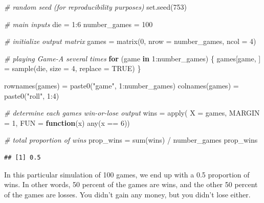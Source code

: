 \documentclass[
]{book}
\newenvironment{Shaded}{\begin{snugshade}}{\end{snugshade}}
\newcommand{\AttributeTok}[1]{\textcolor[rgb]{0.77,0.63,0.00}{#1}}
\newcommand{\CommentTok}[1]{\textcolor[rgb]{0.56,0.35,0.01}{\textit{#1}}}
\newcommand{\ConstantTok}[1]{\textcolor[rgb]{0.00,0.00,0.00}{#1}}
\newcommand{\ControlFlowTok}[1]{\textcolor[rgb]{0.13,0.29,0.53}{\textbf{#1}}}
\newcommand{\DecValTok}[1]{\textcolor[rgb]{0.00,0.00,0.81}{#1}}
\newcommand{\FunctionTok}[1]{\textcolor[rgb]{0.00,0.00,0.00}{#1}}
\newcommand{\NormalTok}[1]{#1}
\newcommand{\OtherTok}[1]{\textcolor[rgb]{0.56,0.35,0.01}{#1}}
\newcommand{\SpecialCharTok}[1]{\textcolor[rgb]{0.00,0.00,0.00}{#1}}
\newcommand{\StringTok}[1]{\textcolor[rgb]{0.31,0.60,0.02}{#1}}
\begin{document}
\begin{Shaded}
\begin{Highlighting}[]
\CommentTok{\# random seed (for reproducibility purposes)}
\FunctionTok{set.seed}\NormalTok{(}\DecValTok{753}\NormalTok{)}

\CommentTok{\# main inputs}
\NormalTok{die }\OtherTok{=} \DecValTok{1}\SpecialCharTok{:}\DecValTok{6}
\NormalTok{number\_games }\OtherTok{=} \DecValTok{100}

\CommentTok{\# initialize output matrix}
\NormalTok{games }\OtherTok{=} \FunctionTok{matrix}\NormalTok{(}\DecValTok{0}\NormalTok{, }\AttributeTok{nrow =}\NormalTok{ number\_games, }\AttributeTok{ncol =} \DecValTok{4}\NormalTok{)}

\CommentTok{\# playing Game{-}A several times}
\ControlFlowTok{for}\NormalTok{ (game }\ControlFlowTok{in} \DecValTok{1}\SpecialCharTok{:}\NormalTok{number\_games) \{}
\NormalTok{  games[game, ] }\OtherTok{=} \FunctionTok{sample}\NormalTok{(die, }\AttributeTok{size =} \DecValTok{4}\NormalTok{, }\AttributeTok{replace =} \ConstantTok{TRUE}\NormalTok{)}
\NormalTok{\}}

\FunctionTok{rownames}\NormalTok{(games) }\OtherTok{=} \FunctionTok{paste0}\NormalTok{(}\StringTok{"game"}\NormalTok{, }\DecValTok{1}\SpecialCharTok{:}\NormalTok{number\_games)}
\FunctionTok{colnames}\NormalTok{(games) }\OtherTok{=} \FunctionTok{paste0}\NormalTok{(}\StringTok{"roll"}\NormalTok{, }\DecValTok{1}\SpecialCharTok{:}\DecValTok{4}\NormalTok{)}

\CommentTok{\# determine each game\textquotesingle{}s win{-}or{-}lose output}
\NormalTok{wins }\OtherTok{=} \FunctionTok{apply}\NormalTok{(}
  \AttributeTok{X =}\NormalTok{ games, }
  \AttributeTok{MARGIN =} \DecValTok{1}\NormalTok{,}
  \AttributeTok{FUN =} \ControlFlowTok{function}\NormalTok{(x) }\FunctionTok{any}\NormalTok{(x }\SpecialCharTok{==} \DecValTok{6}\NormalTok{))}

\CommentTok{\# total proportion of wins}
\NormalTok{prop\_wins }\OtherTok{=} \FunctionTok{sum}\NormalTok{(wins) }\SpecialCharTok{/}\NormalTok{ number\_games}
\NormalTok{prop\_wins}
\end{Highlighting}
\end{Shaded}

\begin{verbatim}
## [1] 0.5
\end{verbatim}

In this particular simulation of 100 games, we end up with a
0.5 proportion of wins. In other words, 50 percent
of the games are wins, and the other 50 percent of the
games are losses. You didn't gain any money, but you didn't lose either.
\end{document}
